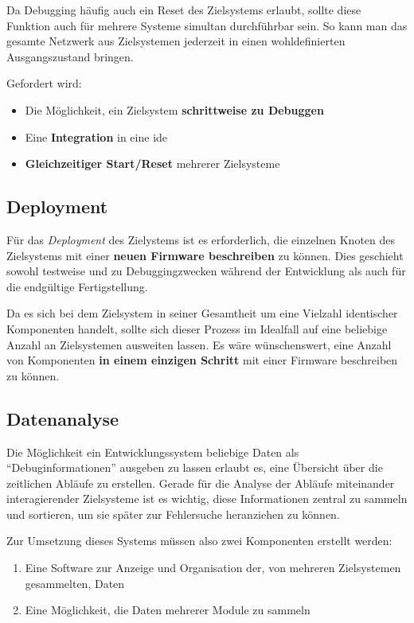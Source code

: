 Da Debugging häufig auch ein Reset des Zielsystems erlaubt, sollte diese
Funktion auch für mehrere Systeme simultan durchführbar sein. So kann man das
gesamte Netzwerk aus Zielsystemen jederzeit in einen wohldefinierten
Ausgangszustand bringen.

\begin{minipage}[c]{\textwidth}
Gefordert wird:
\begin{itemize}
  \item Die Möglichkeit, ein Zielsystem \textbf{schrittweise zu Debuggen}
  \item Eine \textbf{Integration} in eine \gls{ide}
  \item \textbf{Gleichzeitiger Start/Reset} mehrerer Zielsysteme
\end{itemize}
\end{minipage}

\subsection{Deployment} Für das \emph{Deployment} des Zielystems ist es
erforderlich, die einzelnen Knoten des Zielsystems mit einer \textbf{neuen Firmware
beschreiben} zu können. Dies geschieht sowohl testweise und zu Debuggingzwecken
während der Entwicklung als auch für die endgültige Fertigstellung. 

Da es sich bei dem Zielsystem in seiner Gesamtheit um eine Vielzahl identischer
Komponenten handelt, sollte sich dieser Prozess im Idealfall auf
eine beliebige Anzahl an Zielsystemen ausweiten lassen. Es wäre wünschenswert,
eine Anzahl von Komponenten \textbf{in einem einzigen Schritt} mit einer
Firmware beschreiben zu können.

\subsection{Datenanalyse}
Die Möglichkeit ein Entwicklungssystem beliebige
Daten als "`Debuginformationen"' ausgeben zu lassen erlaubt es, eine
Übersicht über die zeitlichen Abläufe zu erstellen. Gerade für die
Analyse der Abläufe miteinander interagierender Zielsysteme ist es wichtig,
diese Informationen zentral zu sammeln und sortieren, um sie später zur
Fehlersuche heranziehen zu können.

Zur Umsetzung dieses Systems müssen also zwei Komponenten erstellt werden:
\begin{enumerate}
  \item Eine Software zur Anzeige und Organisation der, von mehreren
  Zielsystemen gesammelten, Daten
  \item Eine Möglichkeit, die Daten mehrerer Module zu sammeln
\end{enumerate}

